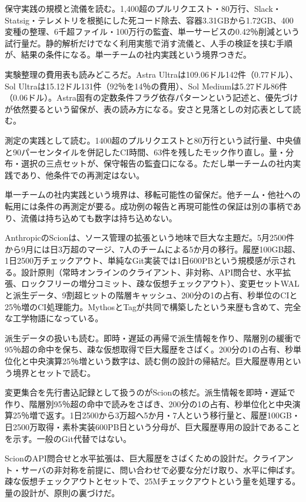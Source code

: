 \documentclass[lualatex,a4paper,10pt]{jlreq}
\begin{document}
保守実践の規模と流儀を読む。1,400超のプルリクエスト・80万行、Slack・Statsig・テレメトリを根拠にした死コード除去、容器3.31GBから1.72GB、400変種の整理、6千超ファイル・100万行の監査、単一サービスの0.42％削減という試行量だ。静的解析だけでなく利用実態で消す流儀と、人手の検証を挟む手順が、結果の条件になる。単一チームの社内実践という境界つきだ。
\cite{B31}


実験整理の費用表も読みどころだ。Astra Ultraは109.06ドル142件（0.77ドル）、Sol Ultraは15.12ドル131件（92％を14％の費用）、Sol Mediumは5.27ドル86件（0.06ドル）。Astra固有の定数条件フラグ依存パターンという記述と、優先づけが依然要るという留保が、表の読み方になる。安さと見落としの対応表として読む。
\cite{B31}


測定の実践として読む。1400超のプルリクエストと80万行という試行量、中央値と90パーセンタイルを併記したCI時間、63件を残したモック作り直し。量・分布・選択の三点セットが、保守報告の監査口になる。ただし単一チームの社内実践であり、他条件での再測定はない。
\cite{B31}


単一チームの社内実践という境界は、移転可能性の留保だ。他チーム・他社への転用には条件の再測定が要る。成功例の報告と再現可能性の保証は別の事柄であり、流儀は持ち込めても数字は持ち込めない。
\cite{B31}


AnthropicのScionは、ソース管理の拡張という地味で巨大な主題だ。5月2500件から9月には日3万超のマージ、7人のチームによる5か月の移行。履歴100GB超、1日2500万チェックアウト、単純なGit実装では1日600PBという規模感が示される。設計原則（常時オンラインのクライアント、非対称、API問合せ、水平拡張、ロックフリーの増分コミット、疎な仮想チェックアウト）、変更セットWALと派生データ、9割超ヒットの階層キャッシュ、200分の1の占有、秒単位のCIと25％増のCI処理能力。MythosとTagが共同で構築したという来歴も含めて、完全な工学物語になっている。
\cite{B32,B75}


派生データの扱いも読む。即時・遅延の再帰で派生情報を作り、階層別の緩衝で95％超の命中を保ち、疎な仮想取得で巨大履歴をさばく。200分の1の占有、秒単位化と中央演算25％増という数字は、読む側の設計の帰結だ。巨大履歴専用という境界とセットで読む。
\cite{B32,B75}


変更集合を先行書込記録として扱うのがScionの核だ。派生情報を即時・遅延で作り、階層別95％超の命中で読みをさばき、200分の1の占有、秒単位化と中央演算25％増で返す。1日2500から3万超へ5か月・7人という移行量と、履歴100GB・日2500万取得・素朴実装600PB日という分母が、巨大履歴専用の設計であることを示す。一般のGit代替ではない。
\cite{B32,B75}


ScionのAPI問合せと水平拡張は、巨大履歴をさばくための設計だ。クライアント・サーバの非対称を前提に、問い合わせで必要な分だけ取り、水平に伸ばす。疎な仮想チェックアウトとセットで、25Mチェックアウトという量を処理する。量の設計が、原則の裏づけだ。
\cite{B32,B75}
\end{document}
